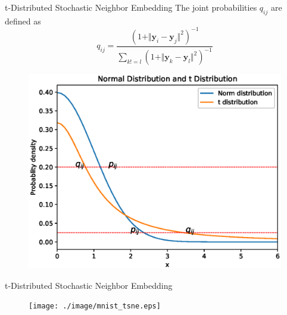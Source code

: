 \documentclass[10pt]{beamer}
\newcommand{\bol}[1]{\textbf{#1}}
\begin{document}
\begin{frame}{t-Distributed Stochastic Neighbor Embedding}
The joint probabilities $q_{ij}$ are defined as
\begin{displaymath}
	q_{ij} = \frac{(1 + \Vert \bol{y}_i - \bol{y}_j \Vert^2)^{-1}}{\sum_{k !=l}(1 + \Vert \bol{y}_k - \bol{y}_l \Vert^2)^{-1}}
\end{displaymath}
\begin{figure}
\centering
\includegraphics[scale=0.45]{./image/tsne5.eps}
\end{figure}
\end{frame}


\begin{frame}{t-Distributed Stochastic Neighbor Embedding}
\begin{figure}
\centering
\texttt{[image: ./image/mnist\_tsne.eps]}
\end{figure}
\end{frame}
\end{document}
